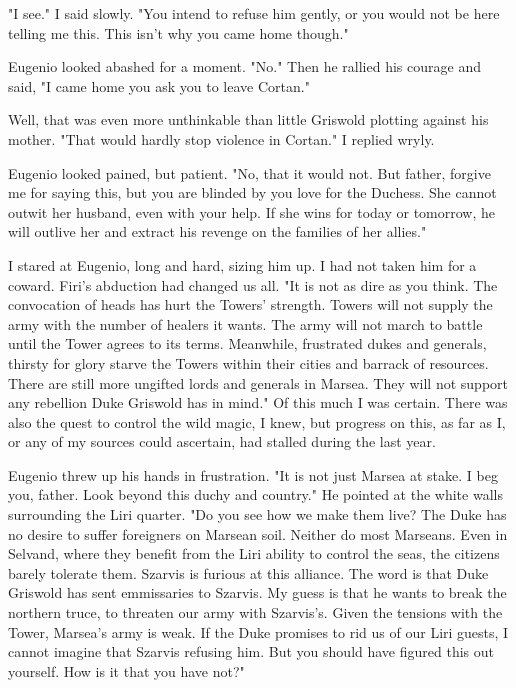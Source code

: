 \documentclass{article}
\begin{document}
"I see." I said slowly. "You intend to refuse him gently, or you would not be here telling me this. This isn't why you came home though."

Eugenio looked abashed for a moment. "No." Then he rallied his courage and said, "I came home you ask you to leave Cortan."

Well, that was even more unthinkable than little Griswold plotting against his mother. "That would hardly stop violence in Cortan." I replied wryly.

Eugenio looked pained, but patient. "No, that it would not. But father, forgive me for saying this, but you are blinded by you love for the Duchess. She cannot outwit her husband, even with your help. If she wins for today or tomorrow, he will outlive her and extract his revenge on the families of her allies."

I stared at Eugenio, long and hard, sizing him up. I had not taken him for a coward. Firi's abduction had changed us all. "It is not as dire as you think. The convocation of heads has hurt the Towers' strength. Towers will not supply the army with the number of healers it wants. The army will not march to battle until the Tower agrees to its terms. Meanwhile, frustrated dukes and generals, thirsty for glory starve the Towers within their cities and barrack of resources. There are still more ungifted lords and generals in Marsea. They will not support any rebellion Duke Griswold has in mind." Of this much I was certain. There was also the quest to control the wild magic, I knew, but progress on this, as far as I, or any of my sources could ascertain, had stalled during the last year.

Eugenio threw up his hands in frustration. "It is not just Marsea at stake. I beg you, father. Look beyond this duchy and country." He pointed at the white walls surrounding the Liri quarter. "Do you see how we make them live? The Duke has no desire to suffer foreigners on Marsean soil. Neither do most Marseans. Even in Selvand, where they benefit from the Liri ability to control the seas, the citizens barely tolerate them. Szarvis is furious at this alliance. The word is that Duke Griswold has sent emmissaries to Szarvis. My guess is that he wants to break the northern truce, to threaten our army with Szarvis's. Given the tensions with the Tower, Marsea's army is weak. If the Duke promises to rid us of our Liri guests, I cannot imagine that Szarvis refusing him. But you should have figured this out yourself. How is it that you have not?"
\end{document}
